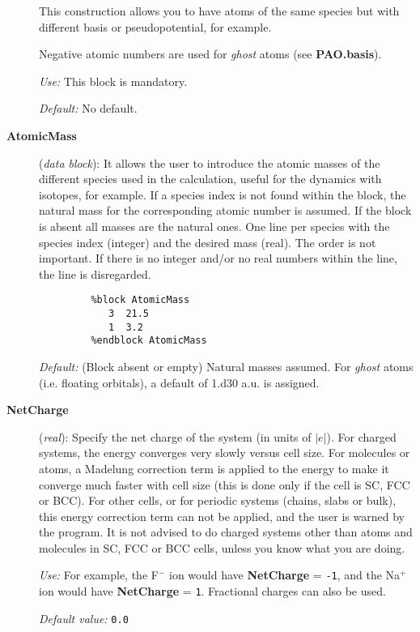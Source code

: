 \begin{description}
This construction allows you to have atoms of the same species but with
different basis or pseudopotential, for example.

Negative atomic numbers are used for {\it ghost} atoms 
(see {\bf PAO.basis}).

{\it Use:} This block is mandatory.

{\it Default:} No default. 



\item[{\bf AtomicMass}] ({\it data block}): 
It allows the user to introduce
the atomic masses of the different species used in the calculation, useful
for the dynamics with isotopes, for example. If
a species index is not found within the block, the natural mass for the 
corresponding atomic number is assumed. If the block is absent all masses
are the natural ones. One line per species with the species index (integer)
and the desired mass (real). The order is not important. If there is no 
integer and/or no real numbers within the line, the line is disregarded.

\begin{verbatim}
         %block AtomicMass
            3  21.5
            1  3.2 
         %endblock AtomicMass
\end{verbatim}

{\it Default:} (Block absent or empty) Natural masses assumed. For 
{\it ghost} atoms (i.e. floating orbitals), a default of 1.d30 a.u. is 
assigned.


\item[{\bf NetCharge}] ({\it real}): 
Specify the net charge of the system (in units of $|e|$). 
For charged systems, the energy converges very slowly
versus cell size. For molecules or atoms, a Madelung
correction term is applied to the energy to make it converge
much faster with cell size (this is done only if
the cell is SC, FCC or BCC). For other cells, or for 
periodic systems (chains, slabs or bulk), this energy
correction term can not be applied, and the user is warned
by the program.   It is not advised to do charged systems
other than atoms and molecules in SC, FCC or BCC cells,
unless you know what you are doing.

{\it Use:} 
For example, the F$^-$ ion would have {\bf NetCharge} = {\tt -1},
and the Na$^+$ ion would have {\bf NetCharge} = {\tt 1}.
Fractional charges can also be used.

{\it Default value:} {\tt 0.0} 


\end{description}


